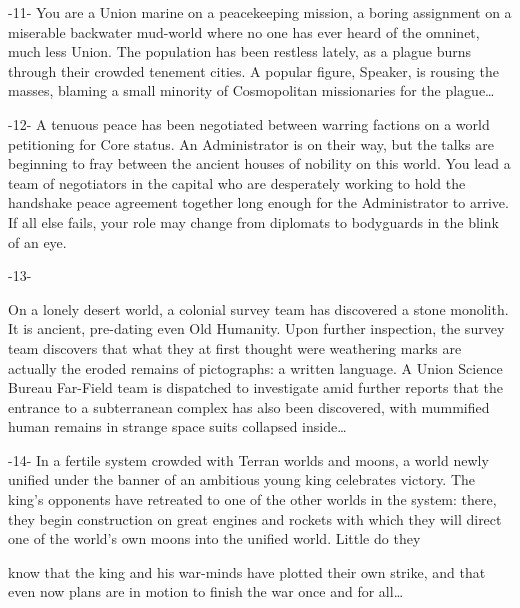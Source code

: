                                                         -11-
You are a Union marine on a peacekeeping mission, a boring assignment on a miserable
backwater mud-world where no one has ever heard of the omninet, much less Union. The
population has been restless lately, as a plague burns through their crowded tenement cities. A
popular figure, Speaker, is rousing the masses, blaming a small minority of Cosmopolitan
missionaries for the plague…

                                                        -12-
A tenuous peace has been negotiated between warring factions on a world petitioning for Core
status. An Administrator is on their way, but the talks are beginning to fray between the ancient
houses of nobility on this world. You lead a team of negotiators in the capital who are desperately
working to hold the handshake peace agreement together long enough for the Administrator to
arrive. If all else fails, your role may change from diplomats to bodyguards in the blink of an eye.



                                                        -13-

On a lonely desert world, a colonial survey team has discovered a stone monolith. It is ancient,
pre-dating even Old Humanity. Upon further inspection, the survey team discovers that what they
at first thought were weathering marks are actually the eroded remains of pictographs: a written
language. A Union Science Bureau Far-Field team is dispatched to investigate amid further
reports that the entrance to a subterranean complex has also been discovered, with mummified
human remains in strange space suits collapsed inside…

                                                        -14-
In a fertile system crowded with Terran worlds and moons, a world newly unified under the
banner of an ambitious young king celebrates victory. The king’s opponents have retreated to one
of the other worlds in the system: there, they begin construction on great engines and rockets
with which they will direct one of the world’s own moons into the unified world. Little do they




know that the king and his war-minds have plotted their own strike, and that even now plans are
in motion to finish the war once and for all…

